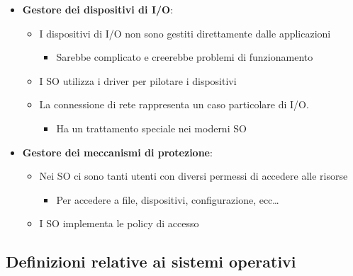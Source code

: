 \documentclass[]{article}
\providecommand{\tightlist}{%
  \setlength{\itemsep}{0pt}\setlength{\parskip}{0pt}}
\begin{document}
\begin{itemize}
\tightlist
\item
  \textbf{Gestore dei dispositivi di I/O}:

  \begin{itemize}
  \tightlist
  \item
    I dispositivi di I/O non sono gestiti direttamente dalle
    applicazioni

    \begin{itemize}
    \tightlist
    \item
      Sarebbe complicato e creerebbe problemi di funzionamento
    \end{itemize}
  \item
    I SO utilizza i driver per pilotare i dispositivi
  \item
    La connessione di rete rappresenta un caso particolare di I/O.

    \begin{itemize}
    \tightlist
    \item
      Ha un trattamento speciale nei moderni SO
    \end{itemize}
  \end{itemize}
\item
  \textbf{Gestore dei meccanismi di protezione}:

  \begin{itemize}
  \tightlist
  \item
    Nei SO ci sono tanti utenti con diversi permessi di accedere alle
    risorse

    \begin{itemize}
    \tightlist
    \item
      Per accedere a file, dispositivi, configurazione, ecc\ldots{}
    \end{itemize}
  \item
    I SO implementa le policy di accesso
  \end{itemize}
\end{itemize}

\hypertarget{definizioni-relative-ai-sistemi-operativi}{%
\subsection{Definizioni relative ai sistemi
operativi}\label{definizioni-relative-ai-sistemi-operativi}}
\end{document}

